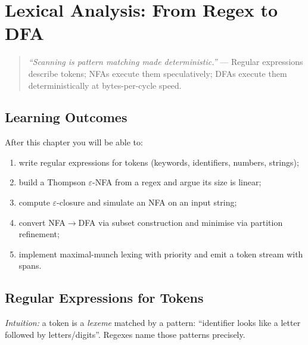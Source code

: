 \chapter{Lexical Analysis: From Regex to DFA}
\label{ch:lexical}

\begin{quote}
\emph{``Scanning is pattern matching made deterministic.''} --- Regular expressions describe tokens; NFAs execute them speculatively; DFAs execute them deterministically at bytes-per-cycle speed.
\end{quote}

\noindent{}
\vspace{0.4em}

\section*{Learning Outcomes}
After this chapter you will be able to:
\begin{enumerate}[label=(L\arabic*)]
    \item write regular expressions for tokens (keywords, identifiers, numbers, strings);
    \item build a Thompson $\varepsilon$-NFA from a regex and argue its size is linear;
    \item compute $\varepsilon$-closure and simulate an NFA on an input string;
    \item convert NFA$\to$DFA via subset construction and minimise via partition refinement;
    \item implement maximal-munch lexing with priority and emit a token stream with spans.
\end{enumerate}

\section{Regular Expressions for Tokens}
\label{sec:regex-tokens}
\emph{Intuition:} a token is a \emph{lexeme} matched by a pattern: ``identifier looks like a letter followed by letters/digits''. Regexes name those patterns precisely.

